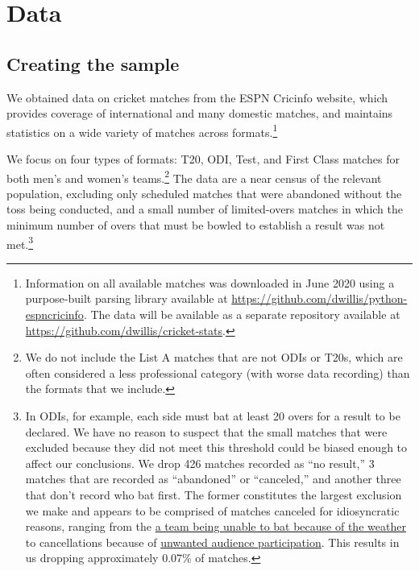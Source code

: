 \documentclass[11pt,  letterpaper]{article}
\begin{document}


\section{Data}

\subsection{Creating the sample}

We obtained data on cricket matches from the ESPN Cricinfo website, which provides coverage of international and many domestic matches,
and maintains statistics on a wide variety of matches across formats.\footnote{Information on all available matches was downloaded in June 2020 using a purpose-built parsing library available at \href{https://github.com/dwillis/python-espncricinfo}{https://github.com/dwillis/python-espncricinfo}. The data will be available as a separate repository available at \href{https://github.com/dwillis/cricket-stats}{https://github.com/dwillis/cricket-stats}.} 

We focus on four types of formats: T20, ODI, Test, and First Class matches for both men's and women's teams.\footnote{We do not include the List A matches that are not ODIs or T20s, which are often considered a less professional category (with worse data recording) than the formats that we include.} The data are a near census of the relevant population, excluding only scheduled matches that were abandoned without the toss being conducted, and a small number of limited-overs matches in which the minimum number of overs that must be bowled to establish a result was not met.\footnote{In ODIs, for example, each side must bat at least 20 overs for a result to be declared. We have no reason to suspect that the small matches that were excluded because they did not meet this threshold could be biased enough to affect our conclusions. We drop 426 matches recorded as ``no result,'' 3 matches that are recorded as ``abandoned'' or ``canceled,'' and another three that don't record who bat first. The former constitutes the largest exclusion we make and appears to be comprised of matches canceled for idiosyncratic reasons, ranging from the \href{https://www.espncricinfo.com/series/shell-tri-series-1991-92-61203/australia-women-vs-england-women-final-66975/full-scorecard}{a team being unable to bat because of the weather} to cancellations because of \href{https://www.espncricinfo.com/series/australia-tour-of-pakistan-1982-83-61392/pakistan-vs-australia-3rd-odi-64196/full-scorecard}{unwanted audience participation}. This results in us dropping approximately 0.07\% of matches.}
\end{document}
